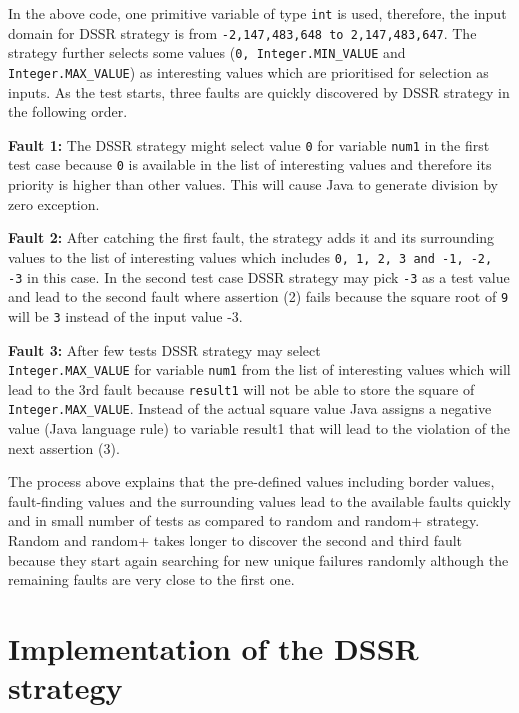 \documentclass{acm_proc_article-sp}
\begin{document}
In the above code, one primitive variable of type \verb+int+ is used, therefore, the input domain for DSSR strategy is from \verb+-2,147,483,648 to 2,147,483,647+. The strategy further selects some values (\verb+0, Integer.MIN_VALUE+ and\\ \verb+Integer.MAX_VALUE+) as interesting values which are prioritised for selection as inputs. 
As the test starts, three faults are quickly discovered by DSSR strategy in the following order.

\indent \textbf{Fault 1:} The DSSR strategy might select value \verb+0+ for variable \verb+num1+  in the first test case because \verb+0+ is available in the list of interesting values and therefore its priority is higher than other values. This will cause Java to generate division by zero exception.

\indent \textbf{Fault 2:} After catching the first fault, the strategy adds it and its surrounding values to the list of interesting values which includes \verb+0, 1, 2, 3 and -1, -2, -3+ in this case. In the second test case DSSR strategy may pick \verb+-3+ as a test value and lead to the second fault where assertion (2) fails because the square root of \verb+9+ will be \verb+3+ instead of the input value -3.

\indent \textbf{Fault 3:} After few tests DSSR strategy may select \\ \verb+Integer.MAX_VALUE+ for variable \verb+num1+  from the list of interesting values which will lead to the 3rd fault because \verb+result1+ will not be able to store the square of \\ \verb+Integer.MAX_VALUE+. Instead of the actual square value Java assigns a negative value (Java language rule) to variable result1 that will lead to the violation of the next assertion (3).

The process above explains that the pre-defined values including border values, fault-finding values and the surrounding values lead to the available faults quickly and in small number of tests as compared to random and random+ strategy. Random and random+ takes longer to discover the second and third fault because they start again searching for new unique failures randomly although the remaining faults are very close to the first one. 




\section{Implementation of the DSSR \\ strategy}\label{sec:imp}
\end{document}
